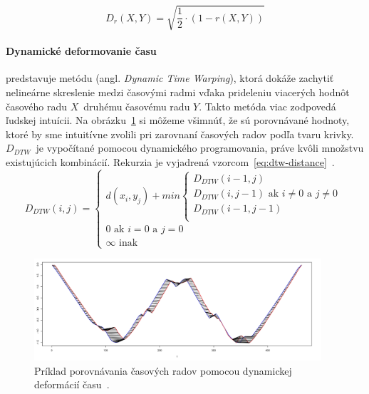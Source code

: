 \documentclass[a4paper,twoside,slovak,12pt,appendix]{article}
\begin{document}
\begin{equation}
	\label{eq:correlation-distance}
  D_r \left( X, Y \right) = \sqrt{\frac{1}{2} \cdot \left( 1 - r \left( X, Y \right) \right)}
\end{equation}


\paragraph{Dynamické deformovanie času} predstavuje metódu (angl.
\textit{Dynamic Time Warping}), ktorá dokáže zachytiť nelineárne skreslenie
medzi časovými radmi vďaka prideleniu viacerých hodnôt časového radu $X$~druhému
časovému radu $Y$. Takto metóda viac zodpovedá ľudskej intuícii. Na
obrázku~\ref{fig:warping-distance} si môžeme všimnúť, že sú porovnávané hodnoty,
ktoré by sme intuitívne zvolili pri zarovnaní časových radov podľa tvaru krivky.
$D_{DTW}$~je vypočítané pomocou dynamického programovania, práve kvôli množstvu
existujúcich kombinácií. Rekurzia je vyjadrená
vzorcom~\ref{eq:dtw-distance}~\cite{Dzeroski2007,Fu2011,Hsu2015}.
\begin{equation}
	\label{eq:dtw-distance}
  D_{DTW} \left( i, j \right) =
  \begin{cases}
    d \left( x_i, y_j \right) + min
    \begin{cases}
      D_{DTW} \left( i-1, j \right) \\
      D_{DTW} \left( i, j-1 \right) \text{ ak } i \neq 0 \text{ a } j \neq 0  \\
      D_{DTW} \left( i-1, j-1 \right) \\
    \end{cases} \\
    0 \text{ ak } i = 0 \text{ a } j = 0 \\
    \infty \text{ inak}
  \end{cases}
\end{equation}

\begin{figure}[htbp]
  \centering
  \includegraphics[width=0.95\textwidth]{warping-distance.png}
  \caption{Príklad porovnávania časových radov pomocou dynamickej deformácií času~\cite{Malinowski2017}.}
  \label{fig:warping-distance}
\end{figure}
\end{document}
